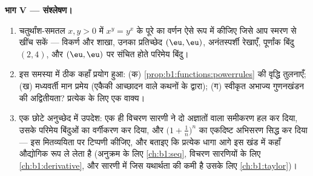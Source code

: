 \begin{problem}
\medskip \noindent\textbf{भाग V --- संश्लेषण।}
\begin{enumerate}[resume]
  \item चतुर्थांश-समतल $x, y > 0$ में $x^y = y^x$ के पूरे  का
  वर्णन ऐसे रूप में कीजिए जिसे आप स्मरण से खींच सकें --- विकर्ण और शाखा,
  उनका प्रतिच्छेद $(\eu, \eu)$, अनंतस्पर्शी रेखाएँ, पूर्णांक बिंदु $(2, 4)$,
  और $(\eu, \eu)$ पर संचित होते परिमेय बिंदु।
  \item इस समस्या में ठीक कहाँ प्रयोग हुआ: (क)
  \cref{prop:b1:functions:powerrules} की वृद्धि तुलनाएँ; (ख) मध्यवर्ती मान
  प्रमेय (एकैकी आच्छादन वाले कथनों के द्वारा); (ग) स्वीकृत अभाज्य गुणनखंडन
  की अद्वितीयता? प्रत्येक के लिए एक वाक्य।
  \item एक छोटे अनुच्छेद में उपदेश: एक ही विचरण सारणी ने दो अज्ञातों वाला
  समीकरण हल कर दिया, उसके परिमेय बिंदुओं का वर्गीकरण कर दिया, और $\bigl(1 +
  \frac1n\bigr)^n$ का एकदिष्ट अभिसरण सिद्ध कर दिया --- इस मितव्ययिता पर
  टिप्पणी कीजिए, और बताइए कि प्रत्येक धागा आगे इस खंड में कहाँ औद्योगिक रूप
  ले लेता है (अनुक्रम के लिए \cref{ch:b1:seq}, विचरण सारणियों के लिए
  \cref{ch:b1:derivative}, और सारणी में जिस यथार्थता की कमी है उसके लिए
  \cref{ch:b1:taylor})।
\end{enumerate}
\end{problem}
